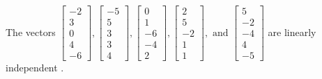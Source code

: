 \begin{exercise}
\begin{exerciseStatement}
  \end{exerciseStatement}
  \begin{exerciseAnswer}
   The vectors \(\left[\begin{array}{r}
-2 \\
3 \\
0 \\
4 \\
-6
\end{array}\right] , \left[\begin{array}{r}
-5 \\
5 \\
3 \\
3 \\
4
\end{array}\right] , \left[\begin{array}{r}
0 \\
1 \\
-6 \\
-4 \\
2
\end{array}\right] , \left[\begin{array}{r}
2 \\
5 \\
-2 \\
1 \\
1
\end{array}\right] , \text{ and } \left[\begin{array}{r}
5 \\
-2 \\
-4 \\
4 \\
-5
\end{array}\right]\) are 
  	 linearly independent  .
  


  \end{exerciseAnswer}
\end{exercise}